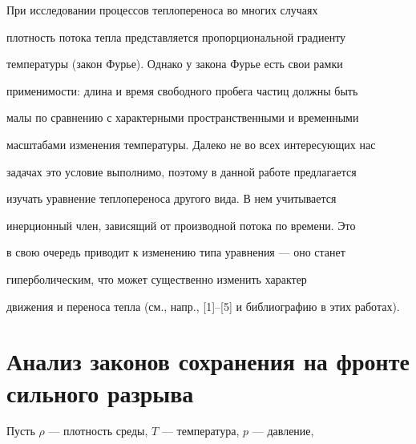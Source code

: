 \pagestyle{plain} %







\maketitle


\label{begin}











При исследовании процессов теплопереноса во многих случаях


плотность потока тепла представляется пропорциональной градиенту


температуры (закон Фурье). Однако у закона Фурье есть свои рамки


применимости: длина и время свободного пробега частиц должны быть 


малы по сравнению с характерными пространственными и временными 


масштабами изменения температуры. Далеко не во всех интересующих нас 


задачах это условие выполнимо, поэтому в данной работе предлагается


изучать уравнение теплопереноса другого вида. В нем учитывается 


инерционный член, зависящий от производной потока по времени. Это


в свою очередь приводит к изменению типа уравнения --- оно станет 


гиперболическим, что может существенно изменить характер


движения и переноса тепла (см., напр., [1]--[5] и библиографию в этих работах).








\section{Анализ законов сохранения на фронте сильного разрыва}





Пусть $\rho$ --- плотность среды, $T$ --- температура, $p$ --- давление,



